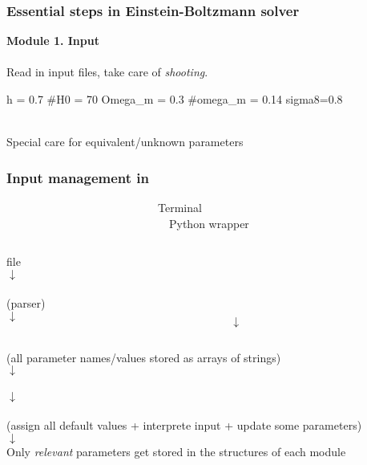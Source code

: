 \begin{frame}[fragile]
	\frametitle{Essential steps in Einstein-Boltzmann solver}
	
	{\bf Module 1. Input}\\
	\mbox{}\\
	Read in input files, take care of \textit{shooting}.
	
	\begin{class}
h = 0.7
#H0 = 70
Omega_m = 0.3
#omega_m = 0.14
sigma8=0.8
	\end{class}
	
	\mbox{}\\
	Special care for equivalent/unknown parameters
	
\end{frame}

\begin{frame}[fragile]
	\frametitle{Input management in {\Red \CLASS{}}}
	
	\begin{block}{~~~~~~~~~~~~~~~~~~~~~~~~~~~Terminal~~~~~~~~~~~~~~~~~~~~~~~~~~~~~~~~~~~~~~~~~~~~~~~~~~~~~~~~~~~~~~~~~~Python wrapper}
		\begin{columns}
			\begin{column}{0.5\textwidth} 
				\begin{center}
					file \\
					$\downarrow$\\
					\\
					(parser)\\
					$\downarrow$\\
				\end{center}
			\end{column}
			\begin{column}{0.5\textwidth} 
				\begin{center}
					\mbox{ }\\
					\mbox{ }\\
					\mbox{ }\\
					\\
					$\downarrow$\\
				\end{center}
			\end{column}
		\end{columns}
		\vspace{-0.3cm}
		\begin{center}
			 (all parameter names/values stored as arrays of strings)\\
			$\downarrow$\\
			\\
			$\downarrow$\\
			\\
			(assign all default values + interprete input + update some parameters)\\
			$\downarrow$\\
			Only {\it relevant} parameters get stored in the structures of each module
		\end{center}
	\end{block}
\end{frame}

